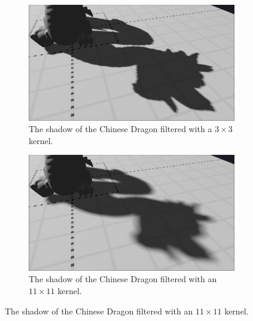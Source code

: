 \begin{figure}[p]
    \centering
    \begin{subfigure}[t]{0.48\textwidth}
		\centering
        \includegraphics[width=\textwidth]{./graf/tests/pcf/cropped/dragon_pcf_fhd_1024_3x3.png}
        \caption{The shadow of the Chinese Dragon filtered with a \(3\times 3\) kernel.}
    \end{subfigure}
	\hfill
    \begin{subfigure}[t]{0.48\textwidth}
		\centering
        \includegraphics[width=\textwidth]{./graf/tests/pcf/cropped/dragon_pcf_fhd_1024_11x11.png}
        \caption{The shadow of the Chinese Dragon filtered with an \(11\times 11\) kernel.}
    \end{subfigure}


\end{figure}
